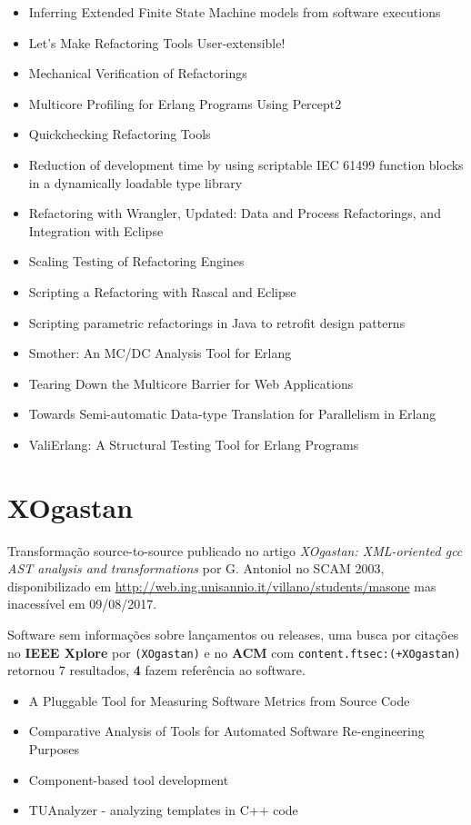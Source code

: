 \begin{itemize}
\item Inferring Extended Finite State Machine models from software executions
\item Let's Make Refactoring Tools User-extensible!
\item Mechanical Verification of Refactorings
\item Multicore Profiling for Erlang Programs Using Percept2
\item Quickchecking Refactoring Tools
\item Reduction of development time by using scriptable IEC 61499 function blocks in a dynamically loadable type library
\item Refactoring with Wrangler, Updated: Data and Process Refactorings, and Integration with Eclipse
\item Scaling Testing of Refactoring Engines
\item Scripting a Refactoring with Rascal and Eclipse
\item Scripting parametric refactorings in Java to retrofit design patterns
\item Smother: An MC/DC Analysis Tool for Erlang
\item Tearing Down the Multicore Barrier for Web Applications
\item Towards Semi-automatic Data-type Translation for Parallelism in Erlang
\item ValiErlang: A Structural Testing Tool for Erlang Programs
\end{itemize}


\section{XOgastan}

Transformação source-to-source
publicado no artigo {\it XOgastan: XML-oriented gcc AST analysis and transformations}
por G. Antoniol
no SCAM 2003,
disponibilizado em \url{http://web.ing.unisannio.it/villano/students/masone}
mas inacessível em 09/08/2017.

Software sem informações sobre lançamentos ou releases,
uma busca por citações no {\bf IEEE Xplore} por
\texttt{(XOgastan)}
e no {\bf ACM} com
\texttt{content.ftsec:(+XOgastan)}
retornou
7 resultados,
{\bf 4} fazem referência ao software.

\begin{itemize}
\item A Pluggable Tool for Measuring Software Metrics from Source Code
\item Comparative Analysis of Tools for Automated Software Re-engineering Purposes
\item Component-based tool development
\item TUAnalyzer - analyzing templates in C++ code
\end{itemize}



